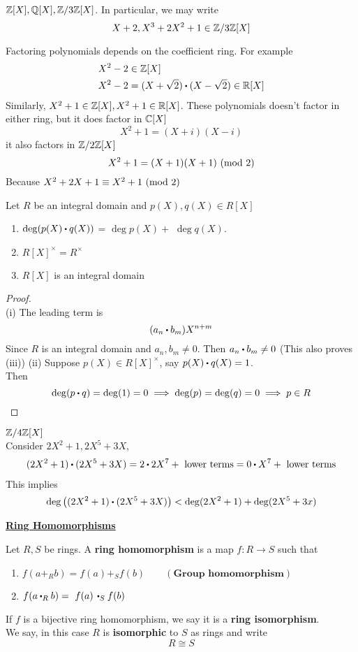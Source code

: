 \documentclass[../Main.tex]{subfiles}
\begin{document}
	\newpage
	\begin{example}
		$\mathbb{Z}[X],\mathbb{Q}[X],\mathbb{Z}/3\mathbb{Z}[X]$. In particular, we may write
		\[X+2, X^3+2X^2+1 \in \mathbb{Z}/3\mathbb{Z}[X]\]
	\end{example}
	Factoring polynomials depends on the coefficient ring. For example
	\begin{align*}
		&X^2-2\in \Z[X] \\
		&X^2-2 = (X+\sqrt{2})\rdot (X-\sqrt{2}) \in \R[X]
	\end{align*}
	Similarly, $X^2+1\in\mathbb{Z}[X], X^2+1\in \mathbb{R}[X]$. These polynomials doesn't factor in either ring, but it does factor in $\mathbb{C}[X]$
	\[X ^2+1=(X+i)(X-i)\]
	it also factors in $\mathbb{Z}/2\mathbb{Z}[X]$
	\[X^2+1=(X+1)(X+1) \ (\mathrm{mod}\ 2)\]
	Because $X^2+2X+1\equiv X^2+1 \ (\mathrm{mod}\ 2)$
	\begin{prop}
		Let $R$ be an integral domain and
		$p(X),q(X)\in R[X]$
		\begin{enumerate}
			\item  $\deg(p(X)\rdot q(X))$ = $\deg p(X)+$  $\deg q(X)$.
			\item $R[X]^\times = R^\times$
			\item $R[X]$ is an integral domain
		\end{enumerate}
	\end{prop}
	\begin{proof}~\\
	(i) The leading term is
			\[(a_n\rdot b_m)X^{n+m}\]
			Since $R$ is an integral domain and $a_n,b_m\ne 0$. Then $a_n\rdot b_m\ne 0$ (This also proves (iii))
	(ii) Suppose $p(X) \in R[X]^\times$, say $p(X)\rdot q(X)=1$.\\
			Then \[\deg(p\rdot q) = \deg(1) = 0\implies \deg(p)=\deg(q)=0\implies p\in R\]
	\end{proof}
	\begin{example}
		$\mathbb{Z}/4\mathbb{Z}[X]$\\
		Consider $2X^2 +1, 2X^5+3X$,
		\begin{align*}
		(2X^2+1)\rdot (2X^5+3X)=2\rdot 2X^7 + \text{ lower terms}
		= 0\rdot X^7 + \text{ lower terms}
		\end{align*}
	This implies
	\[\deg \left((2X^2+1)\rdot (2X^5+3X)\right)<\deg(2X^2+1)+\deg(2X^5+3x) \]
	\end{example}
\newpage
\underline{\textbf{\large{Ring Homomorphisms}}}
\begin{dfn}[title = Ring homomorphism and isomorphism]
	Let $R,S$ be rings. A \textbf{ring homomorphism} is a map $f: R \to S$ such that
	\begin{enumerate}
		\item $f(a+_R b) = f(a) +_S f(b) \qquad (\textbf{Group homomorphism})$
		\item $f(a\rdot_R b) = \,\,f(a)\,\rdot_S f(b)$
	\end{enumerate}
	If $f$ is a bijective ring homomorphism, we say it is a \textbf{ring isomorphism}.\\
	We say, in this case $R$ is \textbf{isomorphic} to $S$ as rings and write
	\[R \cong S\]
\end{dfn}
\end{document}
